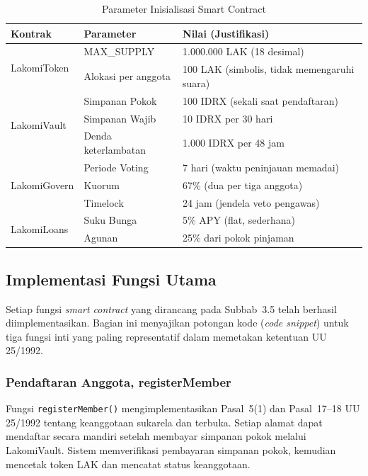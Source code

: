 \begin{table}[H]
\centering
\caption{Parameter Inisialisasi Smart Contract}
\label{tab:init-params}
\footnotesize
\begin{tabular}{p{}p{}p{}}
\toprule
\textbf{Kontrak} & \textbf{Parameter} & \textbf{Nilai (Justifikasi)} \\
\midrule
\multirow{2}{*}{LakomiToken} & MAX\_SUPPLY & 1.000.000 LAK (18 desimal) \\
 & Alokasi per anggota & 100 LAK (simbolis, tidak memengaruhi suara) \\
\midrule
\multirow{3}{*}{LakomiVault} & Simpanan Pokok & 100 IDRX (sekali saat pendaftaran) \\
 & Simpanan Wajib & 10 IDRX per 30 hari \\
 & Denda keterlambatan & 1.000 IDRX per 48 jam \\
\midrule
\multirow{3}{*}{LakomiGovern} & Periode Voting & 7 hari (waktu peninjauan memadai) \\
 & Kuorum & 67\% (dua per tiga anggota) \\
 & Timelock & 24 jam (jendela veto pengawas) \\
\midrule
\multirow{2}{*}{LakomiLoans} & Suku Bunga & 5\% APY (flat, sederhana) \\
 & Agunan & 25\% dari pokok pinjaman \\
\bottomrule
\end{tabular}
\end{table}

\subsection{Implementasi Fungsi Utama}

Setiap fungsi \textit{smart contract} yang dirancang pada Subbab~3.5 telah berhasil diimplementasikan. Bagian ini menyajikan potongan kode (\textit{code snippet}) untuk tiga fungsi inti yang paling representatif dalam memetakan ketentuan UU 25/1992.

\subsubsection{Pendaftaran Anggota, registerMember}

Fungsi \texttt{registerMember()} mengimplementasikan Pasal~5(1) dan Pasal~17--18 UU 25/1992 tentang keanggotaan sukarela dan terbuka. Setiap alamat dapat mendaftar secara mandiri setelah membayar simpanan pokok melalui LakomiVault. Sistem memverifikasi pembayaran simpanan pokok, kemudian mencetak token LAK dan mencatat status keanggotaan.

